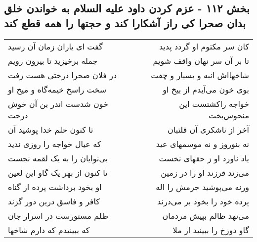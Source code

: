 \begin{center}
\section*{بخش ۱۱۲ - عزم کردن داود علیه السلام به خواندن خلق بدان صحرا کی راز آشکارا کند و  حجتها را همه قطع کند}
\label{sec:sh112}
\begin{longtable}{l p{0.5cm} r}
گفت ای یاران زمان آن رسید
&&
کان سر مکتوم او گردد پدید
\\
جمله برخیزید تا بیرون رویم
&&
تا بر آن سر نهان واقف شویم
\\
در فلان صحرا درختی هست زفت
&&
شاخهااش انبه و بسیار و چفت
\\
سخت راسخ خیمه‌گاه و میخ او
&&
بوی خون می‌آیدم از بیخ او
\\
خون شدست اندر بن آن خوش درخت
&&
خواجه راکشتست این منحوس‌بخت
\\
تا کنون حلم خدا پوشید آن
&&
آخر از ناشکری آن قلتبان
\\
که عیال خواجه را روزی ندید
&&
نه بنوروز و نه موسمهای عید
\\
بی‌نوایان را به یک لقمه نجست
&&
یاد ناورد او ز حقهای نخست
\\
تا کنون از بهر یک گاو این لعین
&&
می‌زند فرزند او را در زمین
\\
او بخود برداشت پرده از گناه
&&
ورنه می‌پوشید جرمش را اله
\\
کافر و فاسق درین دور گزند
&&
پرده خود را بخود بر می‌درند
\\
ظلم مستورست در اسرار جان
&&
می‌نهد ظالم بپیش مردمان
\\
که ببینیدم که دارم شاخها
&&
گاو دوزخ را ببینید از ملا
\\
\end{longtable}
\end{center}
